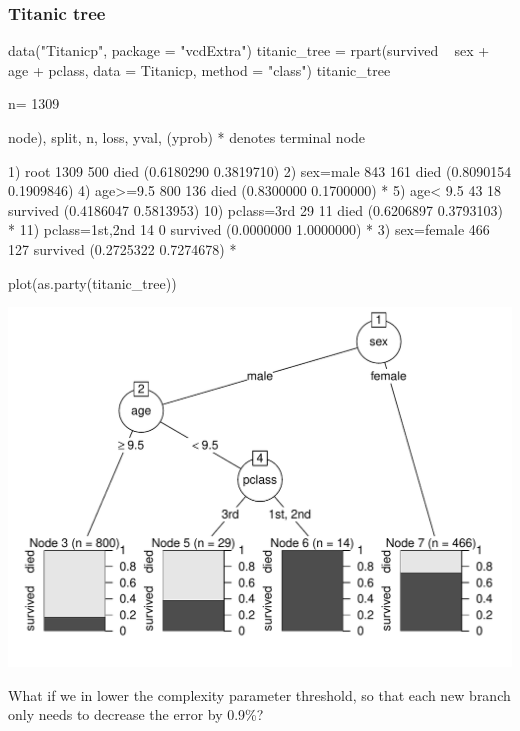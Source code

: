 \documentclass[a4paper]{article}
\begin{document}
\subsubsection{Titanic tree}
\begin{Schunk}
\begin{Sinput}
data("Titanicp", package = "vcdExtra")
titanic_tree = rpart(survived ~ sex + age + pclass, data = Titanicp, method = "class")
titanic_tree
\end{Sinput}
\begin{Soutput}
n= 1309 

node), split, n, loss, yval, (yprob)
      * denotes terminal node

 1) root 1309 500 died (0.6180290 0.3819710)  
   2) sex=male 843 161 died (0.8090154 0.1909846)  
     4) age>=9.5 800 136 died (0.8300000 0.1700000) *
     5) age< 9.5 43  18 survived (0.4186047 0.5813953)  
      10) pclass=3rd 29  11 died (0.6206897 0.3793103) *
      11) pclass=1st,2nd 14   0 survived (0.0000000 1.0000000) *
   3) sex=female 466 127 survived (0.2725322 0.7274678) *
\end{Soutput}
\begin{Sinput}
plot(as.party(titanic_tree))
\end{Sinput}


{\centering \includegraphics[width=0.95\linewidth]{figure/listings-unnamed-chunk-437-1} 

}

\end{Schunk}
What if we in lower the complexity parameter threshold, so that each new branch only needs to decrease the error by 0.9\%?
\end{document}
